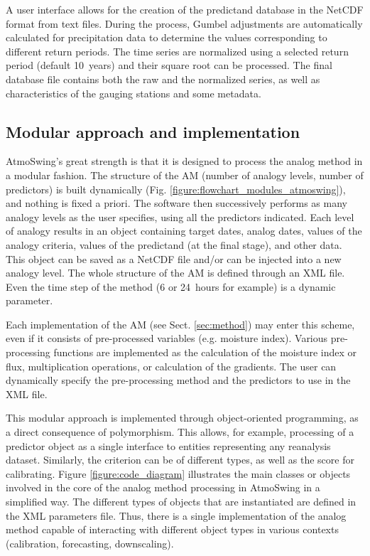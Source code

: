 \documentclass[gmdd]{copernicus}
\begin{document}
A user interface allows for the creation of the predictand database in the NetCDF format from text files. During the process, Gumbel adjustments are automatically calculated for precipitation data to determine the values corresponding to different return periods. The time series are normalized using a selected return period (default 10~years) and their square root can be processed. The final database file contains both the raw and the normalized series, as well as characteristics of the gauging stations and some metadata.


\subsection{Modular approach and implementation}

AtmoSwing's great strength is that it is designed to process the analog method in a modular fashion. The structure of the AM (number of analogy levels, number of predictors) is built dynamically (Fig. \ref{figure:flowchart_modules_atmoswing}), and nothing is fixed a priori. The software then successively performs as many analogy levels as the user specifies, using all the predictors indicated. Each level of analogy results in an object containing target dates, analog dates, values of the analogy criteria, values of the predictand (at the final stage), and other data. This object can be saved as a NetCDF file and/or can be injected into a new analogy level. The whole structure of the AM is defined through an XML file. Even the time step of the method (6 or 24~hours for example) is a dynamic parameter.

Each implementation of the AM (see Sect. \ref{sec:method}) may enter this scheme, even if it consists of pre-processed variables (e.g. moisture index). Various pre-processing functions are implemented as the calculation of the moisture index or flux, multiplication operations, or calculation of the gradients. The user can dynamically specify the pre-processing method and the predictors to use in the XML file.

This modular approach is implemented through object-oriented programming, as a direct consequence of polymorphism. This allows, for example, processing of a predictor object as a single interface to entities representing any reanalysis dataset. Similarly, the criterion can be of different types, as well as the score for calibrating. Figure \ref{figure:code_diagram} illustrates the main classes or objects involved in the core of the analog method processing in AtmoSwing in a simplified way. The different types of objects that are instantiated are defined in the XML parameters file. Thus, there is a single implementation of the analog method capable of interacting with different object types in various contexts (calibration, forecasting, downscaling). 
\end{document}

